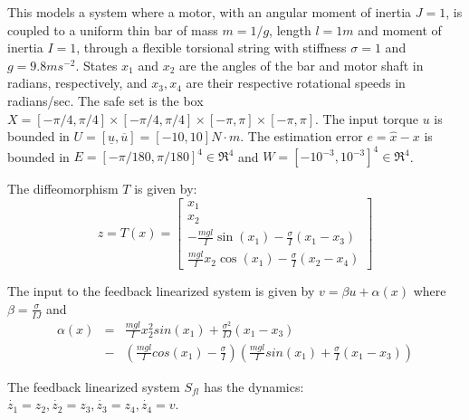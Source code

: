 This models a system where a motor, with an angular moment of inertia $J=1$,  is coupled to a uniform thin bar of mass $m=1/g$, length $l=1m$ and moment of inertia $I=1$, through a flexible torsional string with stiffness $\sigma=1$ and $g=9.8ms^{-2}$. 
States $x_1$ and $x_2$ are the angles of the bar and motor shaft in radians, respectively, and $x_3, x_4$ are their respective rotational speeds in radians/sec.
The safe set is the box $X = [-\pi/4,\pi/4] \times [-\pi/4,\pi/4] \times [-\pi,\pi] \times [-\pi,\pi]$.
The input torque $u$ is bounded in $U = [\underline{u}, \overline{u}] = [-10 , 10 ]N\cdot m$. 
The estimation error $e = \hat{x} - x$ is bounded in $E = [-\pi /180, \pi /180]^4 \in \Re^4$ and $W=[-10^{-3}, 10^{-3}]^4 \in \Re^4$.

The diffeomorphism $T$ is given by:
\begin{equation}
z = T(x) = \begin{bmatrix} x_1 \\ x_2 \\ -\frac{mgl}{I}\sin(x_1) -\frac{\sigma}{I}(x_1-x_3) \\ \frac{mgl}{I}x_2\cos(x_1) - \frac{\sigma}{I}(x_2-x_4)   \end{bmatrix} \nonumber
\end{equation}

The input to the feedback linearized system is given by $v=\beta u+ \alpha(x)$ where $\beta=\frac{\sigma}{IJ} $ and 
\begin{eqnarray*}
\label{eq:fblin_inp}
\alpha(x)&=&\frac{mgl}{I}x_2^2sin(x_1) + \frac{\sigma^2}{IJ}(x_1-x_3) \nonumber \\
&-& (\frac{mgl}{I}cos(x_1)-\frac{\sigma}{I})(\frac{mgl}{I}sin(x_1)+\frac{\sigma}{I}(x_1-x_3))
\end{eqnarray*}

The feedback linearized system $S_{fl}$ has the dynamics:
$\dot{z_1} = z_2, \dot{z_2} = z_3, \dot{z_3} = z_4, \dot{z_4} = v$.



